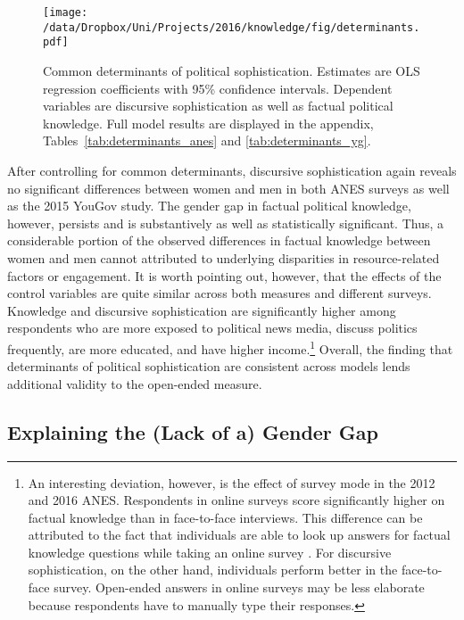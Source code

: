 \begin{figure}[h]\centering
\texttt{[image: /data/Dropbox/Uni/Projects/2016/knowledge/fig/determinants.pdf]}
\caption[Common determinants of political sophistication]{Common determinants of political sophistication. Estimates are OLS regression coefficients with 95\% confidence intervals. Dependent variables are discursive sophistication as well as factual political knowledge. Full model results are displayed in the appendix, Tables~\ref{tab:determinants_anes} and \ref{tab:determinants_yg}.}\label{fig:determinants}
\end{figure}

After controlling for common determinants, discursive sophistication again reveals no significant differences between women and men in both ANES surveys as well as the 2015 YouGov study. The gender gap in factual political knowledge, however, persists and is substantively as well as statistically significant. Thus, a considerable portion of the observed differences in factual knowledge between women and men cannot attributed to underlying disparities in resource-related factors or engagement. It is worth pointing out, however, that the effects of the control variables are quite similar across both measures and different surveys. Knowledge and discursive sophistication are significantly higher among respondents who are more exposed to political news media, discuss politics frequently, are more educated, and have higher income.\footnote{An interesting deviation, however, is the effect of survey mode in the 2012 and 2016 ANES. Respondents in online surveys score significantly higher on factual knowledge than in face-to-face interviews. This difference can be attributed to the fact that individuals are able to look up answers for factual knowledge questions while taking an online survey \citep[cf.][]{clifford2016cheating}. For discursive sophistication, on the other hand, individuals perform better in the face-to-face survey. Open-ended answers in online surveys may be less elaborate because respondents have to manually type their responses.} Overall, the finding that determinants of political sophistication are consistent across models lends additional validity to the open-ended measure.


\subsection*{Explaining the (Lack of a) Gender Gap}

